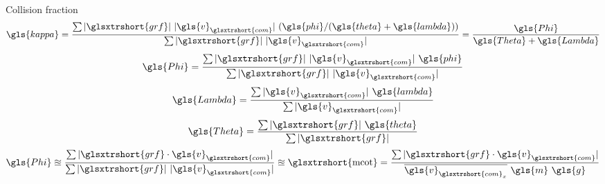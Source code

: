 \begin{frame}{Collision fraction~\cite{Lee2011}}%
    \begin{align}
        \gls{kappa} = \frac{\sum\vert\glsxtrshort{grf}\vert~\vert\gls{v}_{\glsxtrshort{com}}\vert~(\gls{phi} / (\gls{theta} + \gls{lambda}))}{\sum\vert\glsxtrshort{grf}\vert~\vert\gls{v}_{\glsxtrshort{com}}\vert} = \frac{\gls{Phi}}{\gls{Theta} + \gls{Lambda}} \notag
    \end{align}
    \begin{align}
        \gls{Phi} = \frac{\sum\vert\glsxtrshort{grf}\vert~\vert\gls{v}_{\glsxtrshort{com}}\vert~\gls{phi}}{\sum\vert\glsxtrshort{grf}\vert~\vert\gls{v}_{\glsxtrshort{com}}\vert} \notag
    \end{align}
    \begin{align}
        \gls{Lambda} = \frac{\sum\vert\gls{v}_{\glsxtrshort{com}}\vert~\gls{lambda}}{\sum\vert\gls{v}_{\glsxtrshort{com}}\vert} \notag
    \end{align}
    \begin{align}
        \gls{Theta} = \frac{\sum\vert\glsxtrshort{grf}\vert~\gls{theta}}{\sum\vert\glsxtrshort{grf}\vert} \notag
    \end{align}
    \begin{align}
        \gls{Phi} \approxeq \frac{\sum\vert\glsxtrshort{grf} \cdot \gls{v}_{\glsxtrshort{com}}\vert}{\sum\vert\glsxtrshort{grf}\vert~\vert\gls{v}_{\glsxtrshort{com}}\vert} \approxeq \text{\glsxtrshort{mcot}} = \frac{\sum\vert\glsxtrshort{grf} \cdot \gls{v}_{\glsxtrshort{com}}\vert}{\overline{\gls{v}_{\glsxtrshort{com}_x}}~\gls{m}~\gls{g}} \notag
    \end{align}
\end{frame}%
%